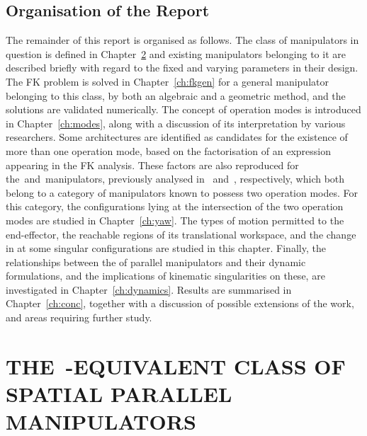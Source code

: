 \documentclass[DD]{iitmdiss}
\newcommand{\mref}[1]{\ref{#1}}
\newcommand{\mcite}[1]{\cite{#1}}
\newcommand{\mlabel}[1]{\label{#1}}
\begin{document}
\section{Organisation of the Report}
%
The remainder of this report is organised as follows. The class of manipulators in question is defined in Chapter~\mref{ch:class} and existing manipulators belonging to it are described briefly with regard to the fixed and varying parameters in their design. The FK problem is solved in Chapter~\mref{ch:fkgen} for a general manipulator belonging to this class, by both an algebraic and a geometric method, and the solutions are validated numerically. The concept of operation modes is introduced in Chapter~\mref{ch:modes}, along with a discussion of its interpretation by various researchers. Some architectures are identified as candidates for the existence of more than one operation mode, based on the factorisation of an expression appearing in the FK analysis. These factors are also reproduced for the~\rps and~\rrs manipulators, previously analysed in~\mcite{tk2017a} and~\mcite{pavanddp}, respectively, which both belong to a category of manipulators known to possess two operation modes. For this category, the configurations lying at the intersection of the two operation modes are studied in Chapter~\mref{ch:yaw}. The types of motion permitted to the end-effector, the reachable regions of its translational workspace, and the change in \dofs at some singular configurations are studied in this chapter. Finally, the relationships between the \dof of parallel manipulators and their dynamic formulations, and the implications of kinematic singularities on these, are investigated in Chapter~\mref{ch:dynamics}. Results are summarised in Chapter~\mref{ch:conc}, together with a discussion of possible extensions of the work, and areas requiring further study.
%
%
\chapter{THE~\rps-EQUIVALENT CLASS OF SPATIAL PARALLEL MANIPULATORS}\mlabel{ch:class}
%
\end{document}
